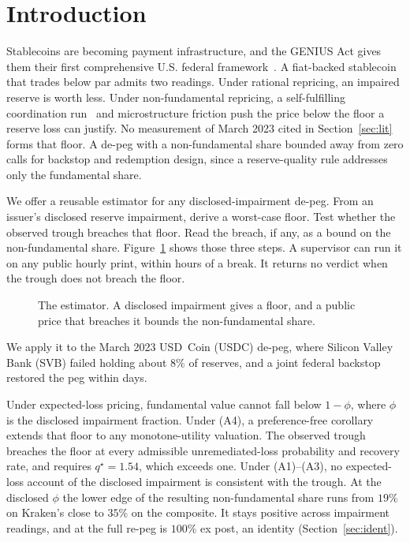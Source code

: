 \section{Introduction}
\label{sec:intro}

Stablecoins are becoming payment infrastructure, and the GENIUS Act gives them their
first comprehensive U.S. federal framework~\cite{geniusact2025}. A fiat-backed stablecoin that
trades below par admits two readings. Under rational repricing, an impaired reserve
is worth less. Under non-fundamental repricing, a self-fulfilling coordination
run~\cite{diamonddybvig1983,goldsteinpauzner2005}
and microstructure friction push the price below the floor a reserve loss can justify. No
measurement of March 2023 cited in Section~\ref{sec:lit} forms that floor. A de-peg with
a non-fundamental share bounded away from zero calls for backstop and redemption design,
since a reserve-quality rule addresses only the fundamental share.

We offer a reusable estimator for any disclosed-impairment de-peg. From an issuer's
disclosed reserve impairment, derive a worst-case floor. Test whether the observed
trough breaches that floor. Read the breach, if any, as a bound on the non-fundamental
share. Figure~\ref{fig:schematic} shows those three steps. A supervisor can run it on any
public hourly print, within hours of a break. It returns no verdict when the trough does not
breach the floor.

\begin{figure}[t]
\centering

\caption{The estimator. A disclosed impairment gives a floor, and a public price that
breaches it bounds the non-fundamental share.}
\label{fig:schematic}
\end{figure}

We apply it to the March 2023 USD~Coin (USDC) de-peg, where Silicon Valley Bank (SVB)
failed holding about $8\%$ of reserves, and a joint federal
backstop~\cite{fedtreasfdic2023pressrelease} restored the peg within days.

Under expected-loss pricing, fundamental value cannot fall below $1-\phi$, where $\phi$ is
the disclosed impairment fraction. Under (A4), a preference-free corollary extends that
floor to any monotone-utility valuation. The observed trough breaches the floor at every admissible
unremediated-loss probability and recovery rate, and requires $q^{\star}=1.54$, which
exceeds one. Under (A1)--(A3), no expected-loss account of the disclosed impairment is
consistent with the trough. At the disclosed $\phi$ the lower edge of the resulting
non-fundamental share runs from $19\%$ on Kraken's close to $35\%$ on the composite. It
stays positive across impairment readings, and at the full re-peg is $100\%$ ex post, an
identity
(Section~\ref{sec:ident}).

